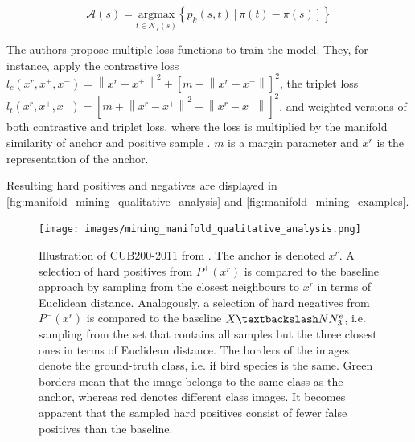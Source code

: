 \begin{equation}
    \mathcal{A}(s) = \underset{t \in \mathcal{N_\varepsilon}(s)}{\text{argmax}} \left\{ p_k(s,t)\left[ \pi(t)-\pi(s) \right] \right\}
    \label{eq:authority_ascent_shift}
\end{equation}



The authors propose multiple loss functions to train the model.
They, for instance, apply the contrastive loss $l_c(x^r, x^+, x^-)= \left\| x^r - x^+ \right\|^2 + \left[ m - \left\| x^r - x^- \right\| \right]^2$, 
the triplet loss $l_t(x^r, x^+, x^-)= \left[ m +  \left\| x^r - x^+ \right\| ^2 - \left\| x^r - x^- \right\| \right]^2$, 
and weighted versions of both contrastive and triplet loss, where the loss is multiplied by the manifold similarity of anchor and positive sample \citep{mining_manifolds_2018}.
$m$ is a margin parameter and $x^r$ is the representation of the anchor.

Resulting hard positives and negatives are displayed in \autoref{fig:manifold_mining_qualitative_analysis} and \autoref{fig:manifold_mining_examples}.

\begin{figure}[!htb] %
    \centering
    \texttt{[image: images/mining\_manifold\_qualitative\_analysis.png]}
    \caption{Illustration of CUB200-2011 from \citet{mining_manifolds_2018}.
    The anchor is denoted $x^r$.
    A selection of hard positives from $P^+(x^r)$ is compared to the 
    baseline approach by sampling from the closest neighbours to $x^r$ in 
    terms of Euclidean distance.
    Analogously, a selection of hard negatives from $P^-(x^r)$ 
    is compared to the baseline $X \textbackslash NN^e_3$, 
    i.e. sampling from the set that contains all samples but the three closest ones in 
    terms of Euclidean distance.
    The borders of the images denote the ground-truth class, i.e. if bird species is the same.
    Green borders mean that the image belongs to the same class as the anchor,
    whereas red denotes different class images.
    It becomes apparent that the sampled hard positives consist of fewer false positives 
    than the baseline.
    }
    \label{fig:manifold_mining_qualitative_analysis}
\end{figure}

